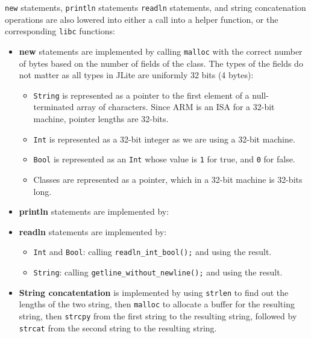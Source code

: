 \documentclass[nonacm, acmsmall, screen, 10pt]{acmart}
\begin{document}
\texttt{new} statements, \texttt{println} statements \texttt{readln} statements, and string concatenation operations are also lowered into either a call into a helper function, or the corresponding \texttt{libc} functions:
\begin{itemize}
  \item \textbf{new} statements are implemented by calling \texttt{malloc} with the correct number of bytes based on the number of fields of the class.
        The types of the fields do not matter as all types in JLite are uniformly 32 bits (4 bytes):
        \begin{itemize}
          \item \texttt{String} is represented as a pointer to the first element of a null-terminated array of characters. Since ARM is an ISA for a 32-bit machine, pointer lengths are 32-bits.
          \item \texttt{Int} is represented as a 32-bit integer as we are using a 32-bit machine.
          \item \texttt{Bool} is represented as an \texttt{Int} whose value is \texttt{1} for true, and \texttt{0} for false.
          \item Classes are represented as a pointer, which in a 32-bit machine is 32-bits long.
        \end{itemize}
  \item \textbf{println} statements are implemented by:
  \item \textbf{readln} statements are implemented by:
        \begin{itemize}
          \item \texttt{Int} and \texttt{Bool}: calling \texttt{readln_int_bool();} and using the result.
          \item \texttt{String}: calling \texttt{getline_without_newline();} and using the result.
        \end{itemize}
  \item \textbf{String concatentation} is implemented by using \texttt{strlen} to find out the lengths of the two string, then \texttt{malloc} to allocate a buffer for the resulting string, then \texttt{strcpy} from the first string to the resulting string, followed by \texttt{strcat} from the second string to the resulting string.
\end{itemize}
\end{document}
